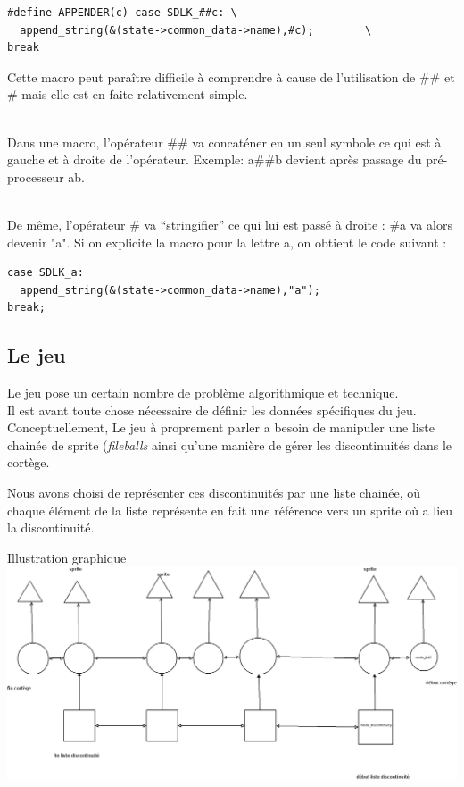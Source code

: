 \begin{lstlisting}
#define APPENDER(c) case SDLK_##c: \
  append_string(&(state->common_data->name),#c);		\
break
\end{lstlisting}
Cette macro peut paraître difficile à comprendre à cause de
l'utilisation de \#\# et \# mais elle est en faite relativement
simple.

~\\
Dans une macro, l'opérateur \#\# va concaténer en un seul symbole ce
qui est à gauche et à droite de l'opérateur. Exemple: a\#\#b devient
après passage du pré-processeur ab.

~\\
De même, l'opérateur \# va ``stringifier'' ce qui lui est passé à
droite : \#a va alors devenir "a". Si on explicite la macro pour la
lettre a, on obtient le code suivant : 

\begin{lstlisting}
case SDLK_a: 
  append_string(&(state->common_data->name),"a");		
break;
\end{lstlisting}

\subsection{Le jeu}
Le jeu pose un certain nombre de problème algorithmique et technique.
~\\
Il est avant toute chose nécessaire de définir les données spécifiques
du jeu.
~\\

Conceptuellement, Le jeu à proprement parler a besoin de manipuler une liste
chainée de sprite (\textit{file\textunderscore balls} ainsi qu'une
manière de gérer les discontinuités dans le cortège.

Nous avons choisi de représenter ces discontinuités par une liste
chainée, où chaque élément de la liste représente en fait une
référence vers un sprite où a lieu la discontinuité.

Illustration graphique 
~\\
\includegraphics[scale=0.3]{img/discontinuity}

